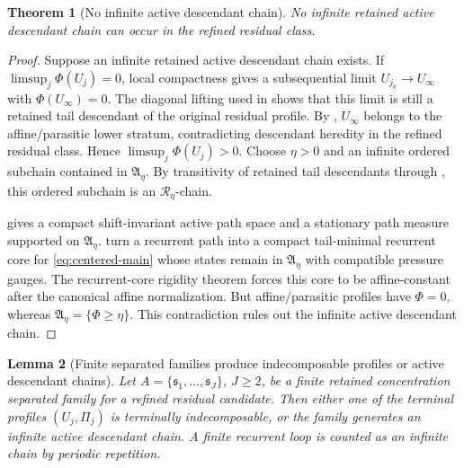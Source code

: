 \documentclass[11pt]{amsart}
\numberwithin{equation}{section}
\theoremstyle{plain}
\newtheorem{theorem}{Theorem}[section]
\newtheorem{lemma}[theorem]{Lemma}
\theoremstyle{definition}
\theoremstyle{remark}
\begin{document}
\begin{theorem}[No infinite active descendant chain]
\label{thm:compact-active-descendant}
No infinite retained active descendant chain can occur in the refined residual
class.
\end{theorem}

\begin{proof}
Suppose an infinite retained active descendant chain exists.  If
\(\limsup_j\Phi(U_j)=0\), local compactness gives a subsequential limit
\(U_{j_k}\to U_\infty\) with \(\Phi(U_\infty)=0\).  The diagonal lifting used in
 shows that this limit is still a
retained tail descendant of the original residual profile.  By
, \(U_\infty\) belongs to the
affine/parasitic lower stratum, contradicting descendant heredity in the
refined residual class.  Hence \(\limsup_j\Phi(U_j)>0\).  Choose
\(\eta>0\) and an infinite ordered subchain contained in \(\mathfrak A_\eta\).
By transitivity of retained tail descendants through
, this ordered subchain is an
\(\mathcal R_\eta\)-chain.

 gives a compact shift-invariant active
path space and a stationary path measure supported on \(\mathfrak A_\eta\).
turn a recurrent path into a compact tail-minimal recurrent core for
\eqref{eq:centered-main} whose states remain in \(\mathfrak A_\eta\) with
compatible pressure gauges.  The recurrent-core rigidity theorem
 forces this core to be affine-constant
after the canonical affine normalization.  But affine/parasitic profiles have
\(\Phi=0\), whereas \(\mathfrak A_\eta=\{\Phi\ge\eta\}\).  This contradiction
rules out the infinite active descendant chain.
\end{proof}

\begin{lemma}[Finite separated families produce indecomposable profiles or active descendant chains]
\label{lem:finite-graph-cycle}
Let \(A=\{\mathfrak s_1,\dots,\mathfrak s_J\}\), \(J\ge2\), be a finite
retained concentration separated family for a refined residual candidate.  Then either one of
the terminal profiles \((U_j,\Pi_j)\) is terminally indecomposable, or the
family generates an infinite active descendant chain.  A finite recurrent loop
is counted as an infinite chain by periodic repetition.
\end{lemma}
\end{document}
